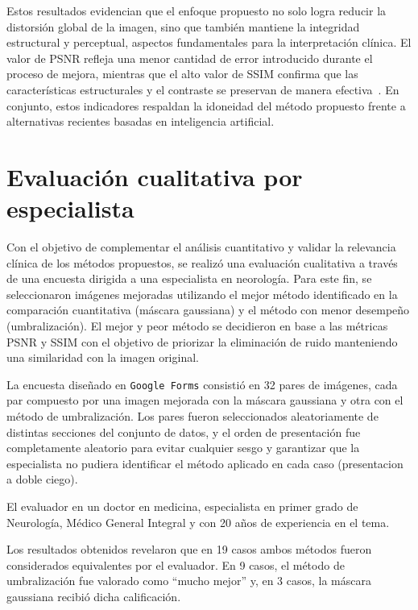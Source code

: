 Estos resultados evidencian que el enfoque propuesto no solo logra reducir la distorsión global de la imagen, sino que también mantiene la integridad estructural y perceptual, aspectos fundamentales para la interpretación clínica. El valor de PSNR refleja una menor cantidad de error introducido durante el proceso de mejora, mientras que el alto valor de SSIM confirma que las características estructurales y el contraste se preservan de manera efectiva~\cite{wang2004image,ImageProcessingBook,upcommonsSSIM2023}. En conjunto, estos indicadores respaldan la idoneidad del método propuesto frente a alternativas recientes basadas en inteligencia artificial.


\section{Evaluación cualitativa por especialista}

Con el objetivo de complementar el análisis cuantitativo y validar la relevancia clínica de los métodos propuestos, se realizó una evaluación cualitativa a través de una encuesta dirigida a una especialista en neorología. Para este fin, se seleccionaron imágenes mejoradas utilizando el mejor método identificado en la comparación cuantitativa (máscara gaussiana) y el método con menor desempeño (umbralización). El mejor y peor método se decidieron en base a las métricas PSNR y SSIM con el objetivo de priorizar la eliminación de ruido manteniendo una similaridad con la imagen original.

La encuesta diseñado en \texttt{Google Forms} \cite{encuesta2025} consistió en 32 pares de imágenes, cada par compuesto por una imagen mejorada con la máscara gaussiana y otra con el método de umbralización. Los pares fueron seleccionados aleatoriamente de distintas secciones del conjunto de datos, y el orden de presentación fue completamente aleatorio para evitar cualquier sesgo y garantizar que la especialista no pudiera identificar el método aplicado en cada caso (presentacion a doble ciego).

El evaluador en un doctor en medicina, especialista en primer grado de Neurología, Médico General Integral y con 20 años de experiencia en el tema.

Los resultados obtenidos revelaron que en 19 casos ambos métodos fueron considerados equivalentes por el evaluador. En 9 casos, el método de umbralización fue valorado como “mucho mejor” y, en 3 casos, la máscara gaussiana recibió dicha calificación.

